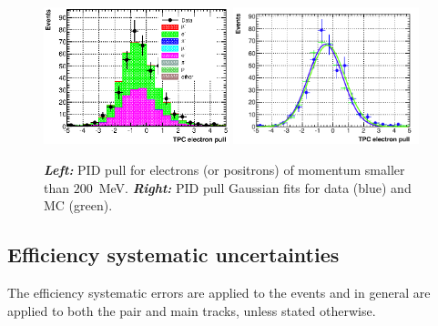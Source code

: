 \begin{figure}[ht]
  \center
  \includegraphics[width=0.48\textwidth]{T2K-TN-254/images/corrections/nopidcor_lowMom.eps}
  \includegraphics[width=0.48\textwidth]{T2K-TN-254/images/corrections/pidcorr_lowMom_fit.pdf}
  \caption[PID pull for electrons (or positrons) of momentum smaller
  than $200$~MeV]{\textbf{\textit{Left:}} \Gls{PID} pull for electrons
    (or positrons) of momentum smaller than $200$~MeV.
    \textbf{\textit{Right:}} \Gls{PID} pull Gaussian fits for data
    (blue) and \Gls{MC} (green).}
  \label{fig:tpcsyst}
\end{figure}


\subsection{Efficiency systematic uncertainties}
The efficiency systematic errors are applied to the events and in
general are applied to both the pair and main tracks, unless stated
otherwise.

